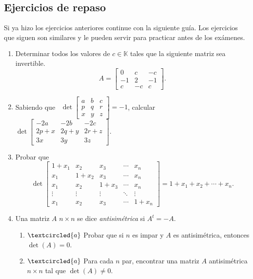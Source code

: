\subsection*{Ejercicios de repaso}
Si ya hizo los ejercicios anteriores continue con la siguiente guía. Los ejercicios que siguen son similares y le pueden servir para practicar antes de los exámenes.


\begin{enumerate}[resume, topsep=6pt,itemsep=.4cm]
\item Determinar todos los valores de $c\in\mathbb{K}$ tales que la siguiente matriz sea invertible.
$$A=\begin{bmatrix} 0&c&-c\\ -1&2&-1\\c&-c&c\end{bmatrix}.$$


\item Sabiendo que \
$
\det \begin{bmatrix} a&b&c\\ p&q&r\\
x&y&z\end{bmatrix}=-1
$,
calcular \
$
\det \begin{bmatrix} -2a&-2b&-2c\\ 2p+x&2q+y&2r+z\\
3x&3y&3z\end{bmatrix}.
$

\item Probar que
$$
\det\begin{bmatrix}
1+x_1 & x_2 & x_3 & \cdots & x_n \\
x_1 & 1+x_2 & x_3 & \cdots & x_n \\
x_1 & x_2 & 1+x_3 & \cdots & x_n \\
\vdots & \vdots & \vdots &\ddots& \vdots \\
x_1 & x_2 & x_3 & \cdots & 1+x_n
\end{bmatrix}
= 1+x_1+x_2 + \cdots + x_n.
$$


\item
Una matriz $A$ $n \times n$ se dice {\it antisimétrica}
si $A^t=-A$.


\begin{enumerate}
\item\label{anti a} $\textcircled{a}$ Probar que si $n$ es impar y $A$ es antisimétrica, entonces
$\det(A)=0$.


\item\label{anti b} $\textcircled{a}$ Para cada $n$ par, encontrar una matriz $A$ antisimétrica
$n \times n$ tal que $\det(A)\not=0$.
\end{enumerate}
	
	
\end{enumerate}


